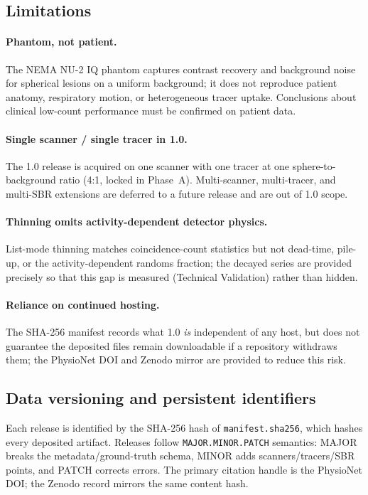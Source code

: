 \documentclass[twoside,11pt]{article}
\begin{document}
\subsection*{Limitations}

\paragraph{Phantom, not patient.} The NEMA NU-2 IQ phantom captures contrast recovery
and background noise for spherical lesions on a uniform background; it does not
reproduce patient anatomy, respiratory motion, or heterogeneous tracer uptake.
Conclusions about clinical low-count performance must be confirmed on patient data.

\paragraph{Single scanner / single tracer in 1.0.} The 1.0 release is acquired on one
scanner with one tracer at one sphere-to-background ratio (4:1, locked in
Phase~A). Multi-scanner,
multi-tracer, and multi-SBR extensions are deferred to a future release and are out of
1.0 scope.

\paragraph{Thinning omits activity-dependent detector physics.} List-mode thinning
matches coincidence-count statistics but not dead-time, pile-up, or the
activity-dependent randoms fraction; the decayed series are provided precisely so that
this gap is measured (Technical Validation) rather than hidden.

\paragraph{Reliance on continued hosting.} The SHA-256 manifest records what 1.0
\emph{is} independent of any host, but does not guarantee the deposited files remain
downloadable if a repository withdraws them; the PhysioNet DOI and Zenodo mirror are
provided to reduce this risk.

\subsection*{Data versioning and persistent identifiers}

Each release is identified by the SHA-256 hash of \texttt{manifest.sha256}, which
hashes every deposited artifact. Releases follow \texttt{MAJOR.MINOR.PATCH} semantics:
MAJOR breaks the metadata/ground-truth schema, MINOR adds scanners/tracers/SBR points,
and PATCH corrects errors. The primary citation handle is the PhysioNet DOI; the Zenodo
record mirrors the same content hash.
\end{document}
